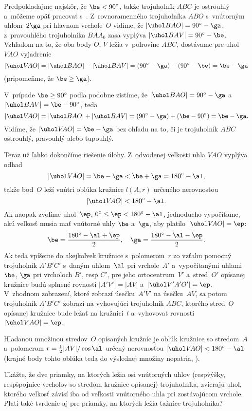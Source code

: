 {Predpokladajme najskôr, že $\be<90^{\circ}$, takže trojuholník $ABC$ je
ostrouhlý a~môžeme opäť pracovať s~. Z~rovnoramenného trojuholníka
$ABO$ s~vnútorným uhlom~$2\ga$ pri hlavnom vrchole~$O$ vidíme, že
$|\uhol BAO|=90^{\circ}-\ga$, z~pravouhlého trojuholníka $BAA_0$ zasa
vyplýva $|\uhol BAV|=90^{\circ}-\be$. Vzhľadom na to, že oba
body $O$, $V$ ležia v~polrovine $ABC$,
dostávame pre uhol $V\!AO$ vyjadrenie
$$
\postdisplaypenalty 1000
|\uhol V\!AO|=|\uhol BAO|-|\uhol BAV|=
(90^{\circ}-\ga)-(90^{\circ}-\be)=\be-\ga
$$
(pripomeňme, že $\be\ge\ga$).

V~prípade $\be\ge90^{\circ}$ podľa  podobne zistíme, že
$|\uhol BAO|=90^{\circ}-\ga$ a~$|\uhol BAV|=\be-90^{\circ}$,
teda
$$
|\uhol V\!AO|=|\uhol BAO|+|\uhol BAV|=
(90^{\circ}-\ga)+(\be-90^{\circ})=\be-\ga.
$$
Vidíme, že $|\uhol V\!AO|=\be-\ga$ bez ohľadu na to,
či je trojuholník $ABC$ ostrouhlý, pravouhlý alebo tupouhlý.

Teraz už ľahko dokončíme riešenie úlohy. Z~odvodenej veľkosti
uhla $V\!AO$ vyplýva odhad
$$
|\uhol V\!AO|=\be-\ga<\be+\ga=180^{\circ}-\al,
$$
takže bod~$O$ leží vnútri oblúka kružnice $l(A,r)$ určeného
nerovnosťou
$$
|\uhol V\!AO|<180^{\circ}-\al.
$$
Ak naopak zvolíme uhol~$\ep$,
$0^{\circ}\le \ep<180^{\circ}-\al$, jednoducho
vypočítame, akú veľkosť musia mať vnútorné uhly $\be$ a~$\ga$,
aby platilo $|\uhol V\!AO|=\ep$:
$$
\be=\frac{180^{\circ}-\al+\ep}{2},\quad
\ga=\frac{180^{\circ}-\al-\ep}{2}.
$$
Ak teda vpíšeme do akejkoľvek kružnice s~polomerom~$r$ zo vzťahu 
pomocný trojuholník $A'B'C'$ s~daným uhlom~$\al$ pri vrchole~$A'$
a~vypočítanými uhlami $\be$, $\ga$ pri vrcholoch $B'$, resp\. $C'$,
pre jeho ortocentrum~$V'$ a~stred~$O'$ opísanej kružnice
budú splnené rovnosti $|A'V'|=|AV|$ a~$|\uhol V'A'O'|=\ep$.
V~zhodnom zobrazení, ktoré zobrazí úsečku~$A'V'$ na úsečku~$AV$,
sa potom trojuholník $A'B'C'$ zobrazí na vyhovujúci trojuholník $ABC$, ktorého
stred~$O$ opísanej kružnice bude ležať na kružnici~$l$ a~vyhovovať
rovnosti $|\uhol VAO|=\ep$.

\zaver
Hľadanou množinou stredov~$O$ opísaných
kružníc je oblúk kružnice so stredom~$A$
a~polomerom $r=\frac12|AV|/\cos\al$
určený nerovnosťou $|\uhol V\!AO|<180^{\circ}-\al$
(krajné body tohto oblúka teda do výslednej množiny nepatria, \obr).
\inspicture{}


Ukážte, že dve priamky, na ktorých ležia osi vnútorných
uhlov (resp\. výšky, resp\. spojnice vrcholov so stredom kružnice opísanej)
trojuholníka, zvierajú uhol, ktorého veľkosť závisí iba od
veľkosti vnútorného uhla pri zostávajúcom vrchole. Platí také tvrdenie
aj pre priamky, na ktorých ležia ťažnice trojuholníka?

}
